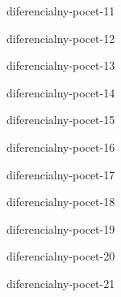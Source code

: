\begin{defproblem}{diferencialny-pocet-11}

\end{defproblem}

\begin{defproblem}{diferencialny-pocet-12}

\end{defproblem}

\begin{defproblem}{diferencialny-pocet-13}

\end{defproblem}

\begin{defproblem}{diferencialny-pocet-14}

\end{defproblem}

\begin{defproblem}{diferencialny-pocet-15}

\end{defproblem}

\begin{defproblem}{diferencialny-pocet-16}

\end{defproblem}

\begin{defproblem}{diferencialny-pocet-17}

\end{defproblem}

\begin{defproblem}{diferencialny-pocet-18}

\end{defproblem}

\begin{defproblem}{diferencialny-pocet-19}

\end{defproblem}

\begin{defproblem}{diferencialny-pocet-20}

\end{defproblem}

\begin{defproblem}{diferencialny-pocet-21}

\end{defproblem}